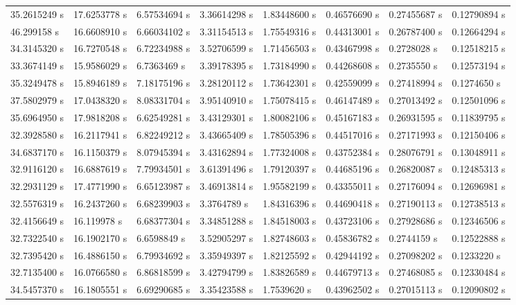 \begin{landscape}
\begin{longtable}{llllllll}
    35.2615249 s& 17.6253778 s& 6.57534694 s& 3.36614298 s& 1.83448600 s& 0.46576690 s& 0.27455687 s& 0.12790894 s\\
    46.299158 s & 16.6608910 s& 6.66034102 s& 3.31154513 s& 1.75549316 s& 0.44313001 s& 0.26787400 s& 0.12664294 s\\
    34.3145320 s& 16.7270548 s& 6.72234988 s& 3.52706599 s& 1.71456503 s& 0.43467998 s& 0.2728028 s & 0.12518215 s\\
    33.3674149 s& 15.9586029 s& 6.7363469 s & 3.39178395 s& 1.73184990 s& 0.44268608 s& 0.2735550 s & 0.12573194 s\\
    35.3249478 s& 15.8946189 s& 7.18175196 s& 3.28120112 s& 1.73642301 s& 0.42559099 s& 0.27418994 s& 0.1274650 s \\
    37.5802979 s& 17.0438320 s& 8.08331704 s& 3.95140910 s& 1.75078415 s& 0.46147489 s& 0.27013492 s& 0.12501096 s\\
    35.6964950 s& 17.9818208 s& 6.62549281 s& 3.43129301 s& 1.80082106 s& 0.45167183 s& 0.26931595 s& 0.11839795 s\\
    32.3928580 s& 16.2117941 s& 6.82249212 s& 3.43665409 s& 1.78505396 s& 0.44517016 s& 0.27171993 s& 0.12150406 s\\
    34.6837170 s& 16.1150379 s& 8.07945394 s& 3.43162894 s& 1.77324008 s& 0.43752384 s& 0.28076791 s& 0.13048911 s\\
    32.9116120 s& 16.6887619 s& 7.79934501 s& 3.61391496 s& 1.79120397 s& 0.44685196 s& 0.26820087 s& 0.12485313 s\\
    32.2931129 s& 17.4771990 s& 6.65123987 s& 3.46913814 s& 1.95582199 s& 0.43355011 s& 0.27176094 s& 0.12696981 s\\
    32.5576319 s& 16.2437260 s& 6.68239903 s& 3.3764789 s & 1.84316396 s& 0.44690418 s& 0.27190113 s& 0.12738513 s\\
    32.4156649 s& 16.119978 s & 6.68377304 s& 3.34851288 s& 1.84518003 s& 0.43723106 s& 0.27928686 s& 0.12346506 s\\
    32.7322540 s& 16.1902170 s& 6.6598849 s & 3.52905297 s& 1.82748603 s& 0.45836782 s& 0.2744159 s & 0.12522888 s\\
    32.7395420 s& 16.4886150 s& 6.79934692 s& 3.35949397 s& 1.82125592 s& 0.42944192 s& 0.27098202 s& 0.1233220 s \\
    32.7135400 s& 16.0766580 s& 6.86818599 s& 3.42794799 s& 1.83826589 s& 0.44679713 s& 0.27468085 s& 0.12330484 s\\
    34.5457370 s& 16.1805551 s& 6.69290685 s& 3.35423588 s& 1.7539620 s & 0.43962502 s& 0.27015113 s& 0.12090802 s\\

\end{longtable}
\end{landscape}
